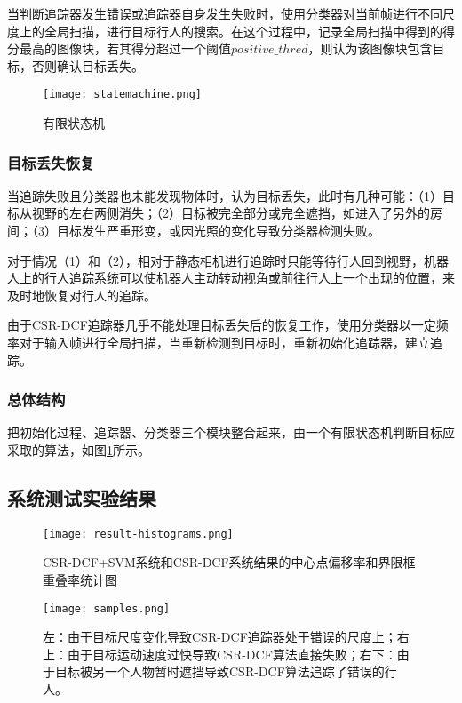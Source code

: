   当判断追踪器发生错误或追踪器自身发生失败时，使用分类器对当前帧进行不同尺度上的全局扫描，进行目标行人的搜索。在这个过程中，记录全局扫描中得到的得分最高的图像块，若其得分超过一个阈值$positive\_thred$，则认为该图像块包含目标，否则确认目标丢失。


\begin{figure}[htb]
  \centering
  \texttt{[image: statemachine.png]}
  \caption{有限状态机}
  \label{fig:statemachine}
\end{figure}

\subsubsection{目标丢失恢复}

  当追踪失败且分类器也未能发现物体时，认为目标丢失，此时有几种可能：（1）目标从视野的左右两侧消失；（2）目标被完全部分或完全遮挡，如进入了另外的房间；（3）目标发生严重形变，或因光照的变化导致分类器检测失败。

  对于情况（1）和（2），相对于静态相机进行追踪时只能等待行人回到视野，机器人上的行人追踪系统可以使机器人主动转动视角或前往行人上一个出现的位置，来及时地恢复对行人的追踪。

  由于CSR-DCF追踪器几乎不能处理目标丢失后的恢复工作，使用分类器以一定频率对于输入帧进行全局扫描，当重新检测到目标时，重新初始化追踪器，建立追踪。


\subsubsection{总体结构}
  把初始化过程、追踪器、分类器三个模块整合起来，由一个有限状态机判断目标应采取的算法，如图\ref{fig:statemachine}所示。



\subsection{系统测试实验结果}

\begin{figure}[htb]
  \centering
  \texttt{[image: result-histograms.png]}
  \caption{CSR-DCF+SVM系统和CSR-DCF系统结果的中心点偏移率和界限框重叠率统计图}
  \label{fig:resulthistogram}
\end{figure}
\begin{figure}[htb]
  \centering
  \texttt{[image: samples.png]}
  \caption{左：由于目标尺度变化导致CSR-DCF追踪器处于错误的尺度上；右上：由于目标运动速度过快导致CSR-DCF算法直接失败；右下：由于目标被另一个人物暂时遮挡导致CSR-DCF算法追踪了错误的行人。}
  \label{fig:samples}
\end{figure}

